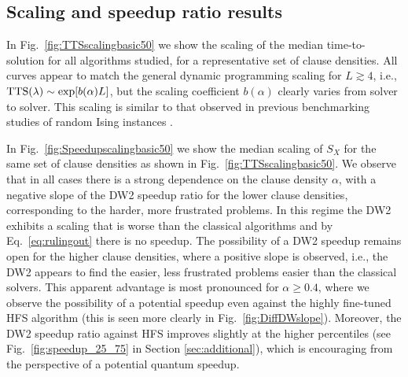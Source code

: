 \subsection{Scaling and speedup ratio results}
In Fig.~\ref{fig:TTSscalingbasic50} we show the scaling of the median time-to-solution for all algorithms studied, for a representative set of clause densities. All curves appear to match the general dynamic programming scaling for $L\gtrsim 4$, i.e., $\textrm{TTS}(\lambda) \sim \exp[b(\alpha) L]$, but the scaling coefficient $b(\alpha)$ clearly varies from solver to solver. This scaling is similar to that observed in previous benchmarking studies of random Ising instances \cite{q108,speedup}.

In Fig.~\ref{fig:Speedupscalingbasic50} we show the median scaling of $S_X$ for the same set of clause densities as shown in Fig.~\ref{fig:TTSscalingbasic50}.
We  observe that in all cases there is a strong dependence on the clause density $\alpha$, with a negative slope of the DW2 speedup ratio for the lower clause densities, corresponding to the harder, more frustrated problems. In this regime the DW2 exhibits a scaling that is worse than the classical algorithms and by Eq.~\eqref{eq:rulingout} there is no speedup. The possibility of a DW2 speedup remains open for the higher clause densities, where a positive slope is observed, i.e., the DW2 appears to find the easier, less frustrated problems easier than the classical solvers. This apparent advantage is most pronounced for $\alpha\geq 0.4$, where we observe the possibility of a potential speedup even against the highly fine-tuned HFS algorithm (this is seen more clearly in Fig.~\ref{fig:DiffDWslope}). Moreover, the DW2 speedup ratio against HFS improves slightly at the higher percentiles (see Fig.~\ref{fig:speedup_25_75} in Section \ref{sec:additional}), which is encouraging from the perspective of a potential quantum speedup.

